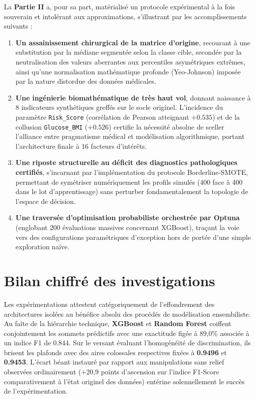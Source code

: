 La \textbf{Partie II} a, pour sa part, matérialisé un protocole expérimental à la fois souverain et intolérant aux approximations, s'illustrant par les accomplissements suivants :

\begin{enumerate}
    \item \textbf{Un assainissement chirurgical de la matrice d'origine}, recourant à une substitution par la médiane segmentée selon la classe cible, secondée par la neutralisation des valeurs aberrantes aux percentiles asymétriques extrêmes, ainsi qu'une normalisation mathématique profonde (Yeo-Johnson) imposée par la nature distordue des données médicales.
    
    \item \textbf{Une ingénierie biomathématique de très haut vol}, donnant naissance à 8 indicateurs synthétiques greffés sur le socle originel. L'incidence du paramètre \texttt{Risk\_Score} (corrélation de Pearson atteignant $+0.535$) et de la collusion \texttt{Glucose\_BMI} ($+0.526$) certifie la nécessité absolue de sceller l'alliance entre pragmatisme médical et modélisation algorithmique, portant l'architecture finale à 16 facteurs d'intérêts.
    
    \item \textbf{Une riposte structurelle au déficit des diagnostics pathologiques certifiés}, s'incarnant par l'implémentation du protocole Borderline-SMOTE, permettant de symétriser numériquement les profils simulés (400 face à 400 dans le lot d'apprentissage) sans perturber fondamentalement la topologie de l'espace de décision.
    
    \item \textbf{Une traversée d'optimisation probabiliste orchestrée par Optuna} (englobant 200 évaluations massives concernant XGBoost), traçant la voie vers des configurations paramétriques d'exception hors de portée d'une simple exploration naïve.
\end{enumerate}

\section*{Bilan chiffré des investigations}

Les expérimentations attestent catégoriquement de l'effondrement des architectures isolées au bénéfice absolu des procédés de modélisation ensembiliste. Au faîte de la hiérarchie technique, \textbf{XGBoost} et \textbf{Random Forest} coiffent conjointement les sommets prédictifs avec une exactitude figée à 89,0\% associée à un indice F1 de 0.844. Sur le versant évaluant l'homogénéité de discrimination, ils brisent les plafonds avec des aires colossales respectives fixées à \textbf{0.9496} et \textbf{0.9453}. L'écart béant instauré par rapport aux manipulations sans relief observées ordinairement (+20,9 points d'ascension sur l'indice F1-Score comparativement à l'état originel des données) entérine solennellement le succès de l'expérimentation.

